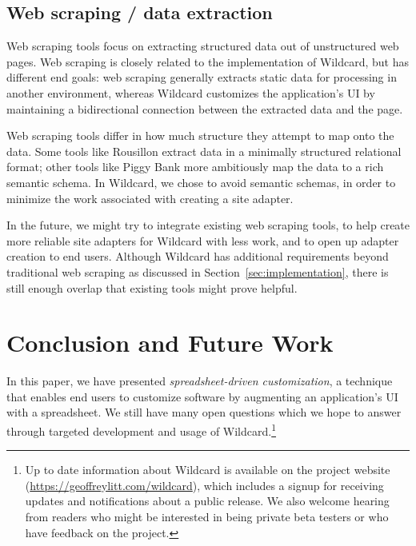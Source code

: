 \documentclass[english,submission]{programming}
\begin{document}
\hypertarget{web-scraping-data-extraction}{%
\subsection{Web scraping / data
extraction}\label{web-scraping-data-extraction}}

Web scraping tools focus on extracting structured data out of
unstructured web pages. Web scraping is closely related to the
implementation of Wildcard, but has different end goals: web scraping
generally extracts static data for processing in another environment,
whereas Wildcard customizes the application's UI by maintaining a
bidirectional connection between the extracted data and the page.

Web scraping tools differ in how much structure they attempt to map onto
the data. Some tools like Rousillon \autocite{chasins2018} extract data
in a minimally structured relational format; other tools like Piggy Bank
\autocite{huynh2005} more ambitiously map the data to a rich semantic
schema. In Wildcard, we chose to avoid semantic schemas, in order to
minimize the work associated with creating a site adapter.

In the future, we might try to integrate existing web scraping tools, to
help create more reliable site adapters for Wildcard with less work, and
to open up adapter creation to end users. Although Wildcard has
additional requirements beyond traditional web scraping as discussed in
Section~\ref{sec:implementation}, there is still enough overlap that
existing tools might prove helpful.

\hypertarget{sec:conclusion}{%
\section{Conclusion and Future Work}\label{sec:conclusion}}

In this paper, we have presented \emph{spreadsheet-driven
customization}, a technique that enables end users to customize software
by augmenting an application's UI with a spreadsheet. We still have many
open questions which we hope to answer through targeted development and
usage of Wildcard.{\footnote{Up to date information about Wildcard is
  available on the project website
  (\url{https://geoffreylitt.com/wildcard}), which includes a signup for
  receiving updates and notifications about a public release. We also
  welcome hearing from readers who might be interested in being private
  beta testers or who have feedback on the project.}}
\end{document}
